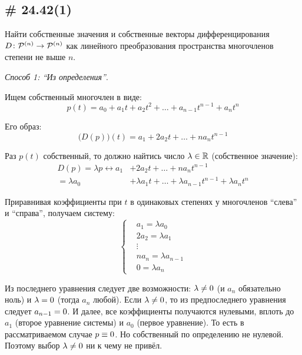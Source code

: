 \documentclass[a4paper,12pt]{article}
\begin{document}
  
  \subsection{\# 24.42(1)}
  
  Найти собственные значения и собственные векторы дифференцирования $D\colon \mathcal P^{(n)} \hm\to \mathcal P^{(n)}$ как линейного преобразования пространства многочленов степени не выше $n$.
  
  \begin{solution}
    \hfill\par
    \emph{Способ 1: ``Из определения''}.
    
    Ищем собственный многочлен в виде:
    \begin{equation}\label{eq:p24-42-p-t}
      p(t) = a_0 + a_1 t + a_2 t^2 + \ldots + a_{n - 1} t^{n - 1} + a_n t^n
    \end{equation}
    
    Его образ:
    \[
      \bigl(D(p)\bigr)(t) = a_1 + 2 a_2 t + \ldots + n a_n t^{n - 1}
    \]
    
    Раз $p(t)$ собственный, то должно найтись число $\lambda \hm\in \RR$ (собственное значение):
    \begin{equation}
    \begin{split}
      D(p) = \lambda p
        \leftrightarrow a_1 &+ 2 a_2 t + \ldots + n a_n t^{n - 1}\\
                      = \lambda a_0 &+ \lambda a_1 t + \ldots + \lambda a_{n - 1} t^{n - 1} + \lambda a_n t^n
    \end{split}
    \end{equation}
    
    Приравнивая коэффициенты при $t$ в одинаковых степенях у многочленов ``слева'' и ``справа'', получаем систему:
    \[
      \left\{
        \begin{aligned}
          &a_1 = \lambda a_0\\
          &2 a_2 = \lambda a_1\\
          &\vdots\\
          &n a_n = \lambda a_{n - 1}\\
          &0 = \lambda a_n
        \end{aligned}
      \right.
    \]
    
    Из последнего уравнения следует две возможности: $\lambda \hm{\not=} 0$ (и $a_n$ обязательно ноль) и $\lambda \hm= 0$ (тогда $a_n$ любой).
    Если $\lambda \hm{\not=} 0$, то из предпоследнего уравнения следует $a_{n - 1} \hm= 0$.
    И далее, все коэффициенты получаются нулевыми, вплоть до $a_1$ (второе уравнение системы) и $a_0$ (первое уравнение).
    То есть в рассматриваемом случае $p \hm\equiv 0$.
    Но собственный по определению не нулевой.
    Поэтому выбор $\lambda \hm{\not=} 0$ ни к чему не привёл.
    

\end{solution}
\end{document}

